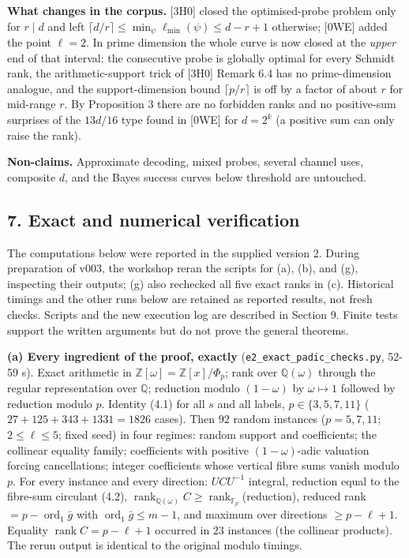 \documentclass[
  11pt,
  a4paper,
]{article}
\begin{document}
\textbf{What changes in the corpus.} {[}3H0{]} closed the
optimised-probe problem only for \(r\mid d\) and left
\(\lceil d/r\rceil\le\min_\psi\ell_{\min}(\psi)\le d-r+1\) otherwise;
{[}0WE{]} added the point \(\ell=2\). In prime dimension the whole curve
is now closed at the \emph{upper} end of that interval: the consecutive
probe is globally optimal for every Schmidt rank, the arithmetic-support
trick of {[}3H0{]} Remark 6.4 has no prime-dimension analogue, and the
support-dimension bound \(\lceil p/r\rceil\) is off by a factor of about
\(r\) for mid-range \(r\). By Proposition 3 there are no forbidden ranks
and no positive-sum surprises of the \(13d/16\) type found in {[}0WE{]}
for \(d=2^k\) (a positive sum can only raise the rank).

\textbf{Non-claims.} Approximate decoding, mixed probes, several channel
uses, composite \(d\), and the Bayes success curves below threshold are
untouched.

\subsection{7. Exact and numerical
verification}\label{exact-and-numerical-verification}

The computations below were reported in the supplied version 2. During
preparation of v003, the workshop reran the scripts for (a), (b), and
(g), inspecting their outputs; (g) also rechecked all five exact ranks
in (c). Historical timings and the other runs below are retained as
reported results, not fresh checks. Scripts and the new execution log
are described in Section 9. Finite tests support the written arguments
but do not prove the general theorems.

\textbf{(a) Every ingredient of the proof, exactly}
({\small\texttt{e2\_\allowbreak{}exact\_\allowbreak{}padic\_\allowbreak{}checks.\allowbreak{}py}}, 52-59 s). Exact arithmetic in
\(\mathbb Z[\omega]=\mathbb Z[x]/\Phi_p\); rank over
\(\mathbb Q(\omega)\) through the regular representation over
\(\mathbb Q\); reduction modulo \((1-\omega)\) by \(\omega\mapsto1\)
followed by reduction modulo \(p\). Identity (4.1) for all \(s\) and all
labels, \(p\in\{3,\allowbreak{}5,\allowbreak{}7,\allowbreak{}11\}\) (\(27+125+343+1331=1826\) cases). Then
\(92\) random instances (\(p=5,\allowbreak{}7,\allowbreak{}11\); \(2\le\ell\le5\); fixed seed) in
four regimes: random support and coefficients; the collinear equality
family; coefficients with positive \((1-\omega)\)-adic valuation forcing
cancellations; integer coefficients whose vertical fibre sums vanish
modulo \(p\). For every instance and every direction: \(UCU^{-1}\)
integral, reduction equal to the fibre-sum circulant (4.2),
\(\operatorname{rank}_{\mathbb Q(\omega)}C\ge\operatorname{rank}_{\mathbb F_p}\)(reduction),
reduced rank \(=p-\operatorname{ord}_1\bar g\) with
\(\operatorname{ord}_1\bar g\le m-1\), and maximum over directions
\(\ge p-\ell+1\). Equality \(\operatorname{rank}C=p-\ell+1\) occurred in
\(23\) instances (the collinear products). The rerun output is identical
to the original modulo timings.
\end{document}
